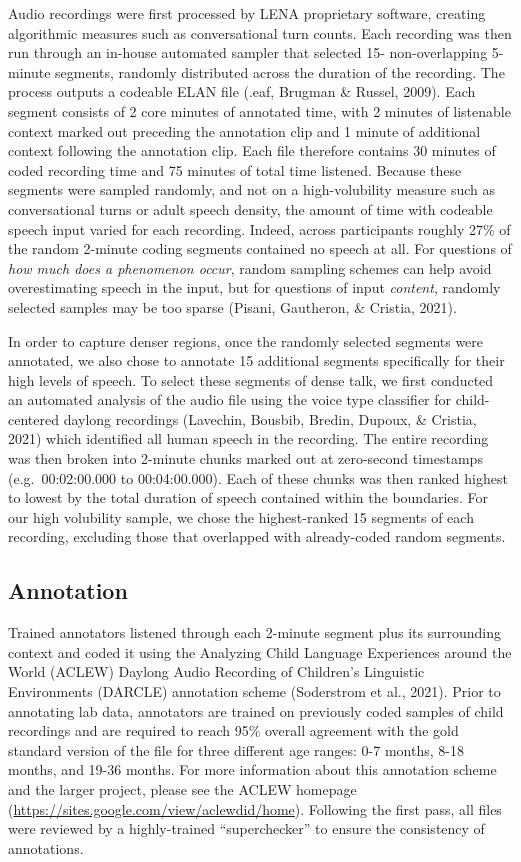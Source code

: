 \documentclass[
  man,floatsintext]{apa6}
\begin{document}
Audio recordings were first processed by LENA proprietary software, creating algorithmic measures such as conversational turn counts. Each recording was then run through an in-house automated sampler that selected 15- non-overlapping 5-minute segments, randomly distributed across the duration of the recording. The process outputs a codeable ELAN file (.eaf, Brugman \& Russel, 2009). Each segment consists of 2 core minutes of annotated time, with 2 minutes of listenable context marked out preceding the annotation clip and 1 minute of additional context following the annotation clip. Each file therefore contains 30 minutes of coded recording time and 75 minutes of total time listened. Because these segments were sampled randomly, and not on a high-volubility measure such as conversational turns or adult speech density, the amount of time with codeable speech input varied for each recording. Indeed, across participants roughly 27\% of the random 2-minute coding segments contained no speech at all. For questions of \emph{how much does a phenomenon occur}, random sampling schemes can help avoid overestimating speech in the input, but for questions of input \emph{content}, randomly selected samples may be too sparse (Pisani, Gautheron, \& Cristia, 2021).

In order to capture denser regions, once the randomly selected segments were annotated, we also chose to annotate 15 additional segments specifically for their high levels of speech. To select these segments of dense talk, we first conducted an automated analysis of the audio file using the voice type classifier for child-centered daylong recordings (Lavechin, Bousbib, Bredin, Dupoux, \& Cristia, 2021) which identified all human speech in the recording. The entire recording was then broken into 2-minute chunks marked out at zero-second timestamps (e.g.~00:02:00.000 to 00:04:00.000). Each of these chunks was then ranked highest to lowest by the total duration of speech contained within the boundaries. For our high volubility sample, we chose the highest-ranked 15 segments of each recording, excluding those that overlapped with already-coded random segments.

\hypertarget{annotation}{%
\subsection{Annotation}\label{annotation}}

Trained annotators listened through each 2-minute segment plus its surrounding context and coded it using the Analyzing Child Language Experiences around the World (ACLEW) Daylong Audio Recording of Children's Linguistic Environments (DARCLE) annotation scheme (Soderstrom et al., 2021). Prior to annotating lab data, annotators are trained on previously coded samples of child recordings and are required to reach 95\% overall agreement with the gold standard version of the file for three different age ranges: 0-7 months, 8-18 months, and 19-36 months. For more information about this annotation scheme and the larger project, please see the ACLEW homepage (\url{https://sites.google.com/view/aclewdid/home}). Following the first pass, all files were reviewed by a highly-trained ``superchecker'' to ensure the consistency of annotations.
\end{document}
